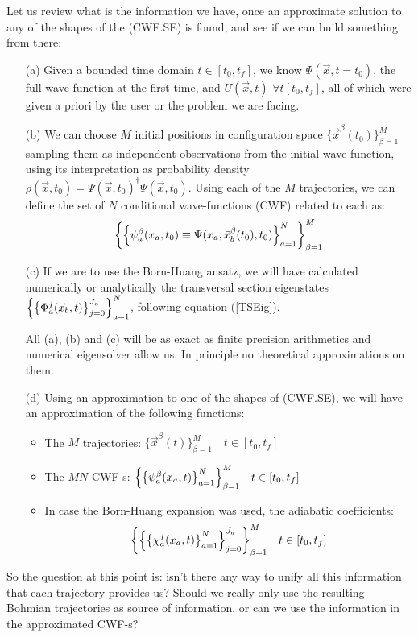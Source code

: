 \documentclass[11pt, a4paper]{article} %
\begin{document}
Let us review what is the information we have, once an approximate solution to any of the shapes of the (CWF.SE) is found, and see if we can build something from there:
\begin{enumerate}
\item[(a)] Given a bounded time domain $t\in [t_0,t_f]$, we know $\Psi(\vec{x},t=t_0)$, the full wave-function at the first time, and $U(\vec{x},t)$ $\forall t[t_0,t_f]$, all of which were given a priori by the user or the problem we are facing.

\item[(b)] We can choose $M$ initial positions in configuration space $\{\vec{x}^\beta(t_0)\}_{\beta=1}^M$ sampling them as independent observations from the initial wave-function, using its interpretation as probability density $\rho(\vec{x},t_0)=\Psi(\vec{x},t_0)^\dagger \Psi(\vec{x},t_0)$. Using each of the $M$ trajectories, we can define the set of $N$ conditional wave-functions (CWF) related to each as:
$$
\qty{\qty{ \psi^\beta_a(x_a,t_0)\equiv\Psi(x_a,\vec{x}_b^\beta(t_0),t_0)}_{a=1}^N}_{\beta=1}^M
$$

\item[(c)] If we are to use the Born-Huang ansatz, we will have calculated numerically or analytically the transversal section eigenstates $\qty{ \qty{ \Phi_a^j(\vec{x}_b,t)}_{j=0}^{J_a}}_{a=1}^N$, following equation (\ref{TSEig}).

All (a), (b) and (c) will be as exact as finite precision arithmetics and numerical eigensolver allow us. In principle no theoretical approximations on them.

\item[(d)] Using an approximation to one of the shapes of (\hyperlink{CWF.SE}{CWF.SE}), we will have an approximation of the following functions: \begin{itemize}
\item The $M$ trajectories: $\{\vec{x}^\beta(t)\}_{\beta=1}^M \quad t \in [t_0, t_f]$ 
\item The $MN$ CWF-s: $\qty{\qty{ \psi^\beta_a(x_a,t)}_{a=1}^N}_{\beta=1}^M \quad t \in [t_0, t_f]$ 
\item In case the Born-Huang expansion was used, the adiabatic coefficients: $$\qty{\qty{\qty{ \chi_a^j(x_a,t)}_{a=1}^N}_{j=0}^{J_a}}_{\beta=1}^M \quad t \in [t_0, t_f]$$
\end{itemize}
\end{enumerate}
So the question at this point is: isn't there any way to unify all this information that each trajectory provides us? Should we really only use the resulting Bohmian trajectories as source of information, or can we use the information in the approximated CWF-s?
\end{document}
